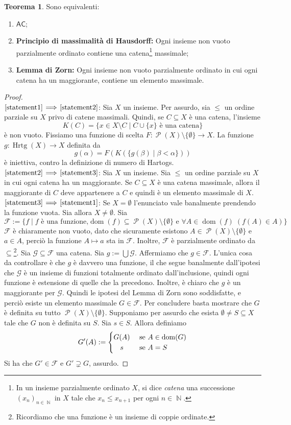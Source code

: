 \documentclass[12pt,a4paper]{report}
\theoremstyle{definition}
\newtheorem{teo}{Teorema}[section]  %
\theoremstyle{num.custom-title}
\DeclareMathOperator{\dom}{dom}
\DeclareMathOperator{\PP}{\mathcal{P}}
\DeclareMathOperator{\Hrtg}{\text{Hrtg}}
\DeclareMathOperator{\N}{\mathbb{N}}
\DeclareMathOperator{\sm}{\setminus}
\newcommand{\AC}{\ensuremath{\mathsf{AC}}\xspace}
\newcommand{\Implies}[2]{$\text{\ref{statement#1}}\!\implies\!\text{\ref{statement#2}}$}%
\newcommand{\punto}[1]{\item \label{statement#1}}
\newenvironment{equivalence}
    {\begin{enumerate}[label=(\arabic*),ref=(\arabic*)]
    }
    { 
	\end{enumerate}
    }
\begin{document}
\begin{teo} Sono equivalenti:
\begin{equivalence}
\punto{1} \AC;
\punto{2} \textbf{Principio di massimalità di Hausdorff:} Ogni insieme non vuoto parzialmente ordinato contiene una catena\footnote{In un insieme parzialmente ordinato $X$, si dice \emph{catena} una successione $(x_n)_{n \in \N}$ in $X$ tale che $x_n \leq x_{n+1}$ per ogni $n \in \N$.} massimale;
\punto{3} \textbf{Lemma di Zorn:} Ogni insieme non vuoto parzialmente ordinato in cui ogni catena ha un maggiorante, contiene un elemento massimale.
\end{equivalence}
\begin{proof}\ \\
\Implies{1}{2}: Sia $X$ un insieme. Per assurdo, sia $\leq$ un ordine parziale su $X$ privo di catene massimali. Quindi, se $C \subseteq X$ è una catena, l'insieme
\[
K(C) = \{x \in X \sm C \mid C \cup \{x\} \text{ è una catena}\}
\]
è non vuoto. Fissiamo una funzione di scelta $F: \PP(X) \sm \{\emptyset\} \to X$. La funzione $g: \Hrtg(X) \to X$ definita da 
\[
g(\alpha) = F(K(\{g(\beta) \mid \beta < \alpha\}))
\]
è iniettiva, contro la definizione di numero di Hartogs.\\
\Implies{2}{3}: Sia $X$ un insieme. Sia $\leq$ un ordine parziale su $X$ in cui ogni catena ha un maggiorante. Se $C \subseteq X$ è una catena massimale, allora il maggiorante di $C$ deve appartenere a $C$ e quindi è un elemento massimale di $X$.\\
\Implies{3}{1}: Se $X=\emptyset$ l'enunciato vale banalmente prendendo la funzione vuota. Sia allora $X \neq \emptyset$. Sia
\[
\mathcal{F}:=\{f \mid f \text{ è una funzione,} \dom(f) \subseteq \PP(X) \sm \{\emptyset\} \text{ e } \forall A \in \dom(f) \; (f(A) \in A)\}
\]
$\mathcal{F}$ è chiaramente non vuoto, dato che sicuramente esistono $A \in \PP(X) \sm \{\emptyset\}$ e $a \in A$, perciò la funzione $A \mapsto a$ sta in $\mathcal{F}$. Inoltre, $\mathcal{F}$ è parzialmente ordinato da $\subseteq$\footnote{Ricordiamo che una funzione è un insieme di coppie ordinate.}. Sia $\mathcal{G} \subseteq \mathcal{F}$ una catena. Sia $g:=\bigcup \mathcal{G}$. Affermiamo che $g \in \mathcal{F}$. L'unica cosa da controllare è che $g$ è davvero una funzione, il che segue banalmente dall'ipotesi che $\mathcal{G}$ è un insieme di funzioni totalmente ordinato dall'inclusione, quindi ogni funzione è estensione di quelle che la precedono. Inoltre, è chiaro che $g$ è un maggiorante per $\mathcal{G}$. Quindi le ipotesi del Lemma di Zorn sono soddisfatte, e perciò esiste un elemento massimale $G \in \mathcal{F}$. Per concludere basta mostrare che $G$ è definita su tutto $\PP(X) \sm \{\emptyset\}$. Supponiamo per assurdo che esista $\emptyset \neq S \subseteq X$ tale che $G$ non è definita su $S$. Sia $s \in S$. Allora definiamo 
\[
G'(A):= 
  \begin{cases} 
      \hfill G(A)	\hfill & \text{ se $A \in \dom(G)$} \\
      \hfill  s		\hfill & \text{ se $A=S$} \\
  \end{cases}
\]
Si ha che $G' \in \mathcal{F}$ e $G' \supsetneq G$, assurdo.
\end{proof}
\end{teo}
\end{document}
